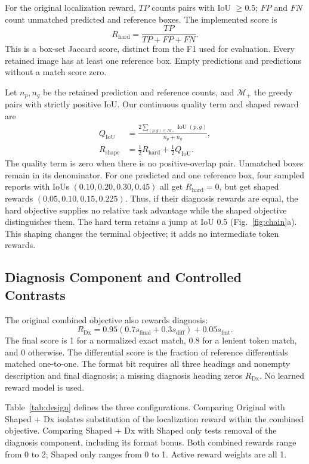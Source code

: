 \documentclass[conference]{IEEEtran}
\begin{document}
For the original localization reward, $TP$ counts pairs with IoU $\geq0.5$; $FP$ and $FN$ count unmatched predicted and reference boxes. The implemented score is
\begin{equation}
 R_{\mathrm{hard}}=\frac{TP}{TP+FP+FN}.
 \label{eq:hard}
\end{equation}
This is a box-set Jaccard score, distinct from the F1 used for evaluation. Every retained image has at least one reference box. Empty predictions and predictions without a match score zero.

Let $n_p,n_g$ be the retained prediction and reference counts, and $\mathcal M_+$ the greedy pairs with strictly positive IoU. Our continuous quality term and shaped reward are
\begin{align}
 Q_{\mathrm{IoU}}&=\frac{2\sum_{(p,g)\in\mathcal M_+}\operatorname{IoU}(p,g)}{n_p+n_g},\\
 R_{\mathrm{shape}}&=\tfrac12R_{\mathrm{hard}}+\tfrac12Q_{\mathrm{IoU}}.
 \label{eq:shape}
\end{align}
The quality term is zero when there is no positive-overlap pair. Unmatched boxes remain in its denominator. For one predicted and one reference box, four sampled reports with IoUs $(0.10,0.20,0.30,0.45)$ all get $R_{\mathrm{hard}}=0$, but get shaped rewards $(0.05,0.10,0.15,0.225)$. Thus, if their diagnosis rewards are equal, the hard objective supplies no relative task advantage while the shaped objective distinguishes them. The hard term retains a jump at IoU 0.5 (Fig.~\ref{fig:chain}a). This shaping changes the terminal objective; it adds no intermediate token rewards.

\subsection{Diagnosis Component and Controlled Contrasts}
The original combined objective also rewards diagnosis:
\begin{equation}
 R_{\mathrm{Dx}}=0.95(0.7s_{\mathrm{final}}+0.3s_{\mathrm{diff}})+0.05s_{\mathrm{fmt}}.
\end{equation}
The final score is 1 for a normalized exact match, 0.8 for a lenient token match, and 0 otherwise. The differential score is the fraction of reference differentials matched one-to-one. The format bit requires all three headings and nonempty description and final diagnosis; a missing diagnosis heading zeros $R_{\mathrm{Dx}}$. No learned reward model is used.

Table~\ref{tab:design} defines the three configurations. Comparing Original with Shaped + Dx isolates substitution of the localization reward within the combined objective. Comparing Shaped + Dx with Shaped only tests removal of the diagnosis component, including its format bonus. Both combined rewards range from 0 to 2; Shaped only ranges from 0 to 1. Active reward weights are all 1.
\end{document}
